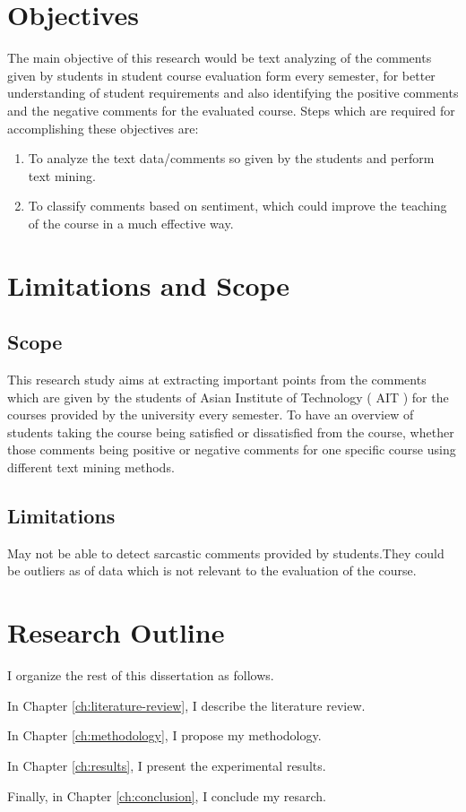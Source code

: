 \section{Objectives}
The main objective of this research would be text analyzing of the comments given by students in student course evaluation form every semester, for better understanding of student requirements and also identifying the positive comments and the negative comments for the evaluated course. Steps which are required for accomplishing these objectives are: 
\begin{enumerate}
    \item To analyze the text data/comments so given by the students and perform text mining. 

    \item To classify comments based on sentiment, which could improve the teaching of the course in a much effective way.    

\end{enumerate}


\section{Limitations and Scope}

\subsection{Scope}

This research study aims at extracting important points from the comments which are given by the students of Asian Institute of Technology ( AIT ) for the courses provided by the university every semester. To have an overview of students taking the course being satisfied or dissatisfied from the course, whether those comments being positive or negative comments for one specific course using different text mining methods. 

\subsection{Limitations}
May not be able to detect sarcastic comments provided by students.They could be outliers as of data which is not relevant to the evaluation of the course.

\section{Research Outline}

I organize the rest of this dissertation as follows.

In Chapter \ref{ch:literature-review}, I describe the literature review.

In Chapter \ref{ch:methodology}, I propose my methodology.

In Chapter \ref{ch:results}, I present the experimental results.

Finally, in Chapter \ref{ch:conclusion}, I conclude my resarch.

\FloatBarrier

